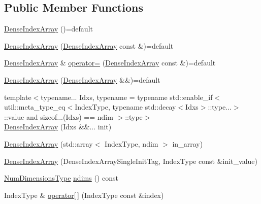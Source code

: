 \subsection*{Public Member Functions}
\begin{DoxyCompactItemize}
\item 
\hyperlink{structvt_1_1index_1_1_dense_index_array_afcd3d27f0c86b6c37540ae78f9afc2d1}{Dense\+Index\+Array} ()=default
\item 
\hyperlink{structvt_1_1index_1_1_dense_index_array_a835d59e4ac4c01436b7068c2fa05137b}{Dense\+Index\+Array} (\hyperlink{structvt_1_1index_1_1_dense_index_array}{Dense\+Index\+Array} const \&)=default
\item 
\hyperlink{structvt_1_1index_1_1_dense_index_array}{Dense\+Index\+Array} \& \hyperlink{structvt_1_1index_1_1_dense_index_array_a5f8e772873b44f670de731fe087e3a5a}{operator=} (\hyperlink{structvt_1_1index_1_1_dense_index_array}{Dense\+Index\+Array} const \&)=default
\item 
\hyperlink{structvt_1_1index_1_1_dense_index_array_a2a9e543ccf3fa97a217ad1c981911634}{Dense\+Index\+Array} (\hyperlink{structvt_1_1index_1_1_dense_index_array}{Dense\+Index\+Array} \&\&)=default
\item 
{\footnotesize template$<$typename... Idxs, typename  = typename std\+::enable\+\_\+if$<$      util\+::meta\+\_\+type\+\_\+eq$<$\+Index\+Type, typename std\+::decay$<$\+Idxs$>$\+::type...$>$\+::value and      sizeof...(\+Idxs) == ndim    $>$\+::type$>$ }\\\hyperlink{structvt_1_1index_1_1_dense_index_array_aa866f038df37f085bc6a48a57bcdaaa3}{Dense\+Index\+Array} (Idxs \&\&... init)
\item 
\hyperlink{structvt_1_1index_1_1_dense_index_array_a2d67c042ae2ac46fb32063ac63c994e8}{Dense\+Index\+Array} (std\+::array$<$ Index\+Type, ndim $>$ in\+\_\+array)
\item 
\hyperlink{structvt_1_1index_1_1_dense_index_array_aa53dfdb3cad352ad2d1d5701d5a4eb3f}{Dense\+Index\+Array} (Dense\+Index\+Array\+Single\+Init\+Tag, Index\+Type const \&init\+\_\+value)
\item 
\hyperlink{namespacevt_1_1index_a97aa9370711425850c86bcb7a20d73e8}{Num\+Dimensions\+Type} \hyperlink{structvt_1_1index_1_1_dense_index_array_acdd28d6484fd548fdd18609b2c7ff4fe}{ndims} () const
\item 
Index\+Type \& \hyperlink{structvt_1_1index_1_1_dense_index_array_ab157c3c1d228b385f2c7be5f78634d93}{operator\mbox{[}$\,$\mbox{]}} (Index\+Type const \&index)
\item 

\end{DoxyCompactItemize}
